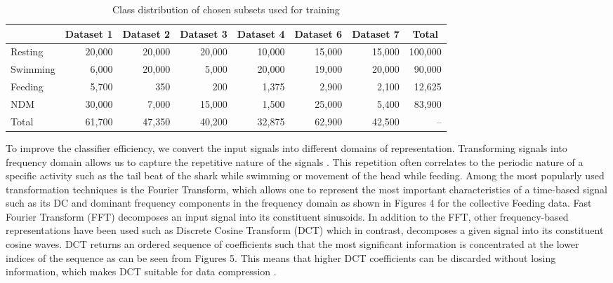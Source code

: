 \documentclass[conference]{IEEEtran}
\begin{document}
\begin{table}[tp!]
	\centering
	\caption{Class distribution of chosen subsets used for training}
	\begin{tabular}{l r r r r r r r}
	\hline
	& \textbf{Dataset 1} & \textbf{Dataset 2} & \textbf{Dataset 3} & \textbf{Dataset 4} & \textbf{Dataset 6} & \textbf{Dataset 7} & \multicolumn{1}{c}{\textbf{Total}}\\
	\hline
	Resting & 20,000 & 20,000 & 20,000 & 10,000 & 15,000 & 15,000 & 100,000 \\
	Swimming & 6,000 & 20,000 & 5,000 & 20,000 & 19,000 & 20,000 & 90,000 \\
	Feeding & 5,700 & 350 & 200 & 1,375 & 2,900 & 2,100 & 12,625 \\
	NDM & 30,000 & 7,000 & 15,000 & 1,500 & 25,000 & 5,400 & 83,900 \\
	Total & 61,700 & 47,350 & 40,200 & 32,875 & 62,900 & 42,500 & -- \\
	\hline
	\end{tabular}
	\label{}
\end{table}
To improve the classifier efficiency, we convert the input signals into different domains of representation. Transforming signals into frequency domain allows us to capture the repetitive nature of the signals \cite{13}. This repetition often correlates to the periodic nature of a specific activity such as the tail beat of the shark while swimming or movement of the head while feeding.  Among the most popularly used transformation techniques is the Fourier Transform, which allows one to represent the most important characteristics of a time-based signal such as its  DC and dominant frequency components in the frequency domain as shown in Figures 4  for the collective Feeding data. Fast Fourier Transform (FFT) decomposes an input signal into its constituent sinusoids. In addition to the FFT, other frequency-based representations have been used such as Discrete Cosine Transform (DCT) which in contrast, decomposes a given signal into its constituent cosine waves. DCT returns an ordered sequence of coefficients such that the most significant information is concentrated at the lower indices of the sequence as can be seen from Figures 5.  This means that higher DCT coefficients can be discarded without losing information, which makes DCT suitable for data compression \cite{14}.
\end{document}
